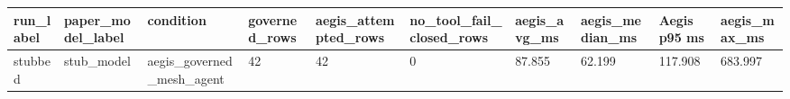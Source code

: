 \begin{tabular}{llllllllll}
 \hline
run\_label & paper\_model\_label & condition & governed\_rows & aegis\_attempted\_rows & no\_tool\_fail\_closed\_rows & aegis\_avg\_ms & aegis\_median\_ms & Aegis p95 ms & aegis\_max\_ms \\
 \hline
stubbed & stub\_model & aegis\_governed\_mesh\_agent & 42 & 42 & 0 & 87.855 & 62.199 & 117.908 & 683.997 \\
 \hline
\end{tabular}
